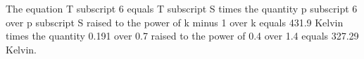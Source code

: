 The equation T subscript 6 equals T subscript S times the quantity p subscript 6 over p subscript S raised to the power of k minus 1 over k equals 431.9 Kelvin times the quantity 0.191 over 0.7 raised to the power of 0.4 over 1.4 equals 327.29 Kelvin.